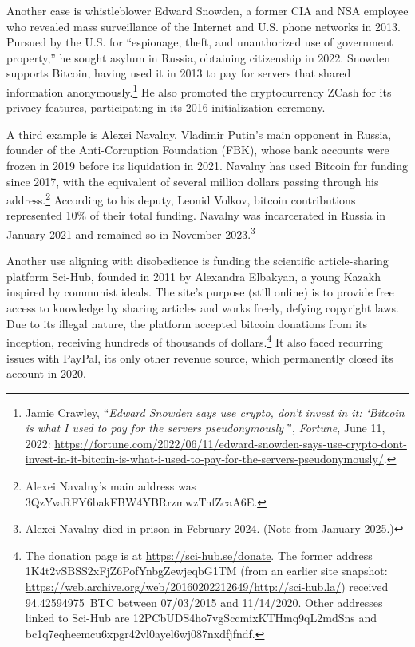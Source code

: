 \documentclass[
  a5paper,
  smalldemyvopaper,10pt,twoside,onecolumn,openright,extrafontsizes,hidelinks]{memoir}
\begin{document}
Another case is whistleblower Edward Snowden, a former CIA and NSA
employee who revealed mass surveillance of the Internet and U.S. phone
networks in 2013. Pursued by the U.S. for ``espionage, theft, and
unauthorized use of government property,'' he sought asylum in Russia,
obtaining citizenship in 2022. Snowden supports Bitcoin, having used it
in 2013 to pay for servers that shared information
anonymously.\footnote{Jamie Crawley, ``\emph{Edward Snowden says use
  crypto, don't invest in it: `Bitcoin is what I used to pay for the
  servers pseudonymously'}'', \emph{Fortune}, June 11, 2022:
  \url{https://fortune.com/2022/06/11/edward-snowden-says-use-crypto-dont-invest-in-it-bitcoin-is-what-i-used-to-pay-for-the-servers-pseudonymously/}.}
He also promoted the cryptocurrency ZCash for its privacy features,
participating in its 2016 initialization ceremony.

A third example is Alexei Navalny, Vladimir Putin's main opponent in
Russia, founder of the Anti-Corruption Foundation (FBK), whose bank
accounts were frozen in 2019 before its liquidation in 2021. Navalny has
used Bitcoin for funding since 2017, with the equivalent of several
million dollars passing through his address.\footnote{Alexei Navalny's
  main address was 3QzYvaRFY6bakFBW4YBRrzmwzTnfZcaA6E.} According to his
deputy, Leonid Volkov, bitcoin contributions represented 10\% of their
total funding. Navalny was incarcerated in Russia in January 2021 and
remained so in November 2023.\footnote{Alexei Navalny died in prison in
  February 2024. (Note from January 2025.)}

Another use aligning with disobedience is funding the scientific
article-sharing platform Sci-Hub, founded in 2011 by Alexandra Elbakyan,
a young Kazakh inspired by communist ideals. The site's purpose (still
online) is to provide free access to knowledge by sharing articles and
works freely, defying copyright laws. Due to its illegal nature, the
platform accepted bitcoin donations from its inception, receiving
hundreds of thousands of dollars.\footnote{The donation page is at
  \url{https://sci-hub.se/donate}. The former address
  1K4t2vSBSS2xFjZ6PofYnbgZewjeqbG1TM (from an earlier site snapshot:
  \url{https://web.archive.org/web/20160202212649/http://sci-hub.la/})
  received 94.42594975~BTC between 07/03/2015 and 11/14/2020. Other
  addresses linked to Sci-Hub are 12PCbUDS4ho7vgSccmixKTHmq9qL2mdSns and
  bc1q7eqheemcu6xpgr42vl0ayel6wj087nxdfjfndf.} It also faced recurring
issues with PayPal, its only other revenue source, which permanently
closed its account in 2020.
\end{document}
